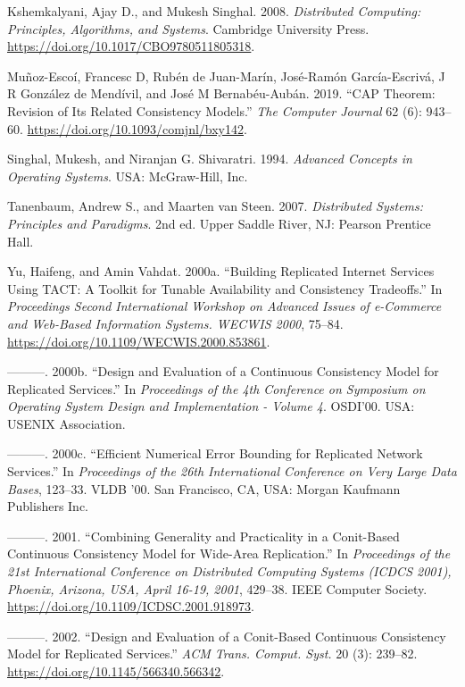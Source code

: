 \documentclass[]             %
{NASA}                       %
\newlength{\cslhangindent}
\newlength{\cslentryspacingunit} %
\newenvironment{CSLReferences}[2] %
 {%
  \setlength{\parindent}{0pt}
  \ifodd #1
  \let\oldpar\par
  \def\par{\hangindent=\cslhangindent\oldpar}
  \fi
  \setlength{\parskip}{#2\cslentryspacingunit}
 }%
 {}
\theoremstyle{definition}
\begin{document}
\begin{CSLReferences}{1}{0}
\leavevmode{}%
Kshemkalyani, Ajay D., and Mukesh Singhal. 2008. \emph{Distributed
Computing: Principles, Algorithms, and Systems}. Cambridge University
Press. \url{https://doi.org/10.1017/CBO9780511805318}.

\leavevmode{}%
Muñoz-Escoí, Francesc D, Rubén de Juan-Marín, José-Ramón García-Escrivá,
J R González de Mendívil, and José M Bernabéu-Aubán. 2019. {``CAP
Theorem: Revision of Its Related Consistency Models.''} \emph{The
Computer Journal} 62 (6): 943--60.
\url{https://doi.org/10.1093/comjnl/bxy142}.

\leavevmode{}%
Singhal, Mukesh, and Niranjan G. Shivaratri. 1994. \emph{Advanced
Concepts in Operating Systems}. USA: McGraw-Hill, Inc.

\leavevmode{}%
Tanenbaum, Andrew S., and Maarten van Steen. 2007. \emph{Distributed
Systems: Principles and Paradigms}. 2nd ed. Upper Saddle River, NJ:
Pearson Prentice Hall.

\leavevmode{}%
Yu, Haifeng, and Amin Vahdat. 2000a. {``Building Replicated Internet
Services Using TACT: A Toolkit for Tunable Availability and Consistency
Tradeoffs.''} In \emph{Proceedings Second International Workshop on
Advanced Issues of e-Commerce and Web-Based Information Systems. WECWIS
2000}, 75--84. \url{https://doi.org/10.1109/WECWIS.2000.853861}.

\leavevmode{}%
---------. 2000b. {``Design and Evaluation of a Continuous Consistency
Model for Replicated Services.''} In \emph{{Proceedings of the 4th
Conference on Symposium on Operating System Design and Implementation -
Volume 4}}. OSDI'00. USA: USENIX Association.

\leavevmode{}%
---------. 2000c. {``Efficient Numerical Error Bounding for Replicated
Network Services.''} In \emph{Proceedings of the 26th International
Conference on Very Large Data Bases}, 123--33. VLDB '00. San Francisco,
CA, USA: Morgan Kaufmann Publishers Inc.

\leavevmode{}%
---------. 2001. {``Combining Generality and Practicality in a
Conit-Based Continuous Consistency Model for Wide-Area Replication.''}
In \emph{Proceedings of the 21st International Conference on Distributed
Computing Systems {(ICDCS} 2001), Phoenix, Arizona, USA, April 16-19,
2001}, 429--38. {IEEE} Computer Society.
\url{https://doi.org/10.1109/ICDSC.2001.918973}.

\leavevmode{}%
---------. 2002. {``Design and Evaluation of a Conit-Based Continuous
Consistency Model for Replicated Services.''} \emph{ACM Trans. Comput.
Syst.} 20 (3): 239--82. \url{https://doi.org/10.1145/566340.566342}.

\end{CSLReferences}



\end{document}
